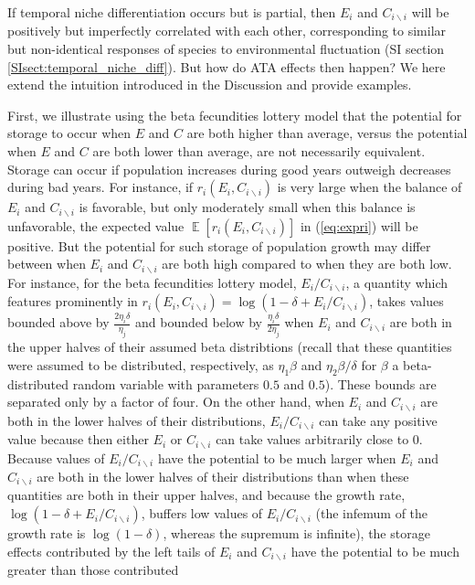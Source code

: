 \documentclass[letterpaper,11pt]{article}
\DeclareMathOperator{\E}{\mathbb{E}}%
\newcommand{\bs}{\backslash}
\begin{document}
If temporal niche differentiation occurs but is partial, 
then $E_i$ and $C_{i \bs i}$ will be positively but imperfectly correlated with
each other, corresponding to similar but non-identical responses of species to
environmental fluctuation (SI section \ref{SIsect:temporal_niche_diff}). 
But how do ATA effects then happen? We here extend the intuition
introduced in the Discussion and provide examples. 

First, we illustrate using the beta fecundities lottery model that
the potential for storage to occur when 
$E$ and $C$ are both higher than average, versus the potential  
when $E$ and $C$ are
both lower than average, are not necessarily equivalent.
Storage can occur if population
increases during good years outweigh decreases during bad years. For instance,
if $r_i(E_i,C_{i \bs i})$ is very large when the balance of $E_i$ and 
$C_{i \bs i}$ is favorable, but only moderately small when this balance is
unfavorable, the expected value $\E[r_i(E_i,C_{i \bs i})]$ in (\ref{eq:expri})
will be positive. But the potential for such storage of population growth
may differ between when $E_i$ and $C_{i \bs i}$ are both high compared
to when they are both low. 
For instance, for the beta fecundities lottery model, $E_i/C_{i \bs i}$, a quantity
which features prominently in $r_i(E_i,C_{i \bs i})=\log(1-\delta+E_i/C_{i \bs i})$,
takes values bounded above by $\frac{2\eta_i \delta}{\eta_j}$ 
and bounded below by $\frac{\eta_i \delta}{2 \eta_j}$ when $E_i$ and $C_{i \bs i}$
are both in the upper halves of their assumed beta distribtions (recall that 
these quantities were assumed to be distributed, respectively, as $\eta_1 \beta$
and $\eta_2 \beta/\delta$ for $\beta$ a beta-distributed random variable with parameters 
$0.5$ and $0.5$). These bounds are separated only by a factor of four. 
On the other hand, when $E_i$ and $C_{i \bs i}$ are both in the lower halves 
of their distributions, $E_i/C_{i \bs i}$ can take any positive value because
then either $E_i$ or $C_{i \bs i}$ can take values arbitrarily close to $0$. 
Because values of $E_i/C_{i \bs i}$ have the potential to be much larger when 
$E_i$ and $C_{i \bs i}$ are both in the lower halves of their distributions
than when these quantities are both in their upper halves, and because
the growth rate, $\log(1-\delta+E_i/C_{i \bs i})$, buffers low values of 
$E_i/C_{i \bs i}$ (the infemum of the growth rate is $\log(1-\delta)$, whereas the supremum is
infinite), the storage effects contributed by the left tails of 
$E_i$ and $C_{i \bs i}$ have the potential to be much greater than those contributed
\end{document}
